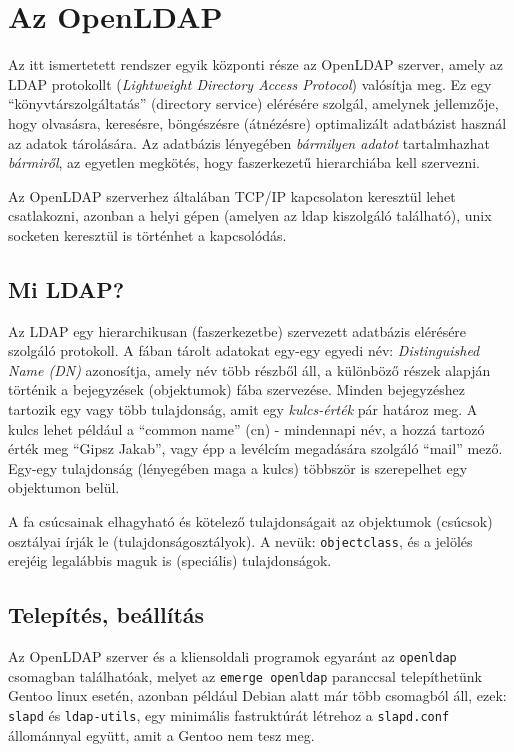 \section{Az OpenLDAP}

Az itt ismertetett rendszer egyik központi része az OpenLDAP szerver, amely az LDAP protokollt ({\em Lightweight
  Directory Access Protocol}) valósítja meg. Ez egy ``könyvtárszolgáltatás''
(directory service) elérésére szolgál, amelynek jellemzője, hogy olvasásra, keresésre, böngészésre (átnézésre)
optimalizált adatbázist használ az adatok tárolására. Az adatbázis lényegében \emph{bármilyen adatot} tartalmhazhat
\emph{bármiről}, az egyetlen megkötés, hogy faszerkezetű hierarchiába kell szervezni.

Az OpenLDAP szerverhez általában TCP/IP kapcsolaton keresztül lehet csatlakozni, azonban a helyi gépen (amelyen az
ldap kiszolgáló található), unix socketen keresztül is történhet a kapcsolódás.

\subsection{Mi LDAP?}

Az LDAP egy hierarchikusan (faszerkezetbe) szervezett adatbázis elérésére szolgáló protokoll. A fában tárolt adatokat
egy-egy egyedi név: {\em Distinguished Name (DN)} azonosítja, amely név több részből áll, a  különböző részek alapján
történik a bejegyzések (objektumok) fába szervezése. Minden bejegyzéshez tartozik egy vagy több
tulajdonság, amit egy {\em kulcs-érték} pár határoz meg. A kulcs lehet például a ``common name'' (cn) - mindennapi
név, a hozzá tartozó érték meg ``Gipsz Jakab'', vagy épp a levélcím megadására szolgáló ``mail'' mező. Egy-egy
tulajdonság (lényegében maga a kulcs) többször is szerepelhet egy objektumon belül.

A fa csúcsainak elhagyható és kötelező tulajdonságait az objektumok (csúcsok) osztályai írják le
(tulajdonságosztályok). A nevük: \texttt{objectclass}, és a jelölés erejéig legalábbis  maguk is (speciális)
tulajdonságok.


\subsection{Telepítés, beállítás}
Az OpenLDAP szerver és a kliensoldali programok egyaránt az \texttt{openldap} csomagban találhatóak, melyet az
\texttt{emerge openldap} paranccsal telepíthetünk Gentoo linux esetén, azonban például Debian alatt már több csomagból
áll, ezek: \texttt{slapd} és \texttt{ldap-utils}, egy minimális fastruktúrát létrehoz a \texttt{slapd.conf}
állománnyal együtt, amit a Gentoo nem tesz meg.

